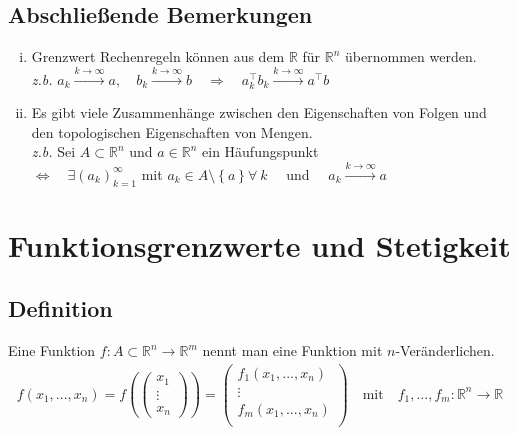 \documentclass[11pt,a4paper]{book}
\newcommand {\R}	{\mathbb{R}}
\newcommand {\Rn}	{\mathbb{R}^n}
\newcommand {\Rm}	{\mathbb{R}^m}
\newcommand{\1}    	{\mathbbm{1}}
\begin{document}
\subsection{Abschließende Bemerkungen}
\begin{enumerate}[(i)]
	\item Grenzwert Rechenregeln können aus dem \(\R\) für \(\Rn\) übernommen werden. \\
	\textit{z.b.} \( a_k \stackrel{k \rightarrow \infty}{\rightarrow} a, \quad b_k \stackrel{k \rightarrow \infty}{\rightarrow} b 
	\quad \Rightarrow \quad a_k^\top b_k \stackrel{k \rightarrow \infty}{\rightarrow} a^\top b \)
	\item Es gibt viele Zusammenhänge zwischen den Eigenschaften von Folgen und den topologischen Eigenschaften von Mengen. \\
	\textit{z.b.} Sei \(A \subset \Rn\) und \(a \in \Rn\) ein Häufungspunkt \\
	\(\Leftrightarrow \quad \exists (a_k)_{k=1}^\infty \) mit \( a_k \in A \setminus \left\{ a \right\} \forall~ k \quad \) und \( \quad a_k \stackrel{k \rightarrow \infty}{\rightarrow} a\)
\end{enumerate}

\section{Funktionsgrenzwerte und Stetigkeit}

\subsection{Definition}
Eine Funktion \(f : A \subset \Rn \rightarrow \Rm \) nennt man eine Funktion mit \(n\)-Veränderlichen.
\begin{align*}
	f(x_1, ..., x_n) = f( \left( \begin{array}{c} x_1 \\ \vdots \\ x_n \end{array} \right) ) = \left( \begin{array}{c}
		f_1(x_1, ..., x_n) \\
		\vdots \\
		f_m(x_1, ..., x_n) \\
	\end{array} \right) \quad \textrm{mit} \quad f_1, ..., f_m : \Rn \rightarrow \R
\end{align*}
\end{document}
